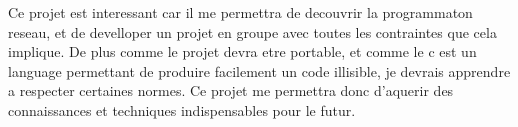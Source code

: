 Ce projet est interessant car il me permettra de decouvrir la programmaton reseau, et de develloper un projet en groupe avec toutes les contraintes que cela implique. De plus comme le projet devra etre portable, et comme le c est un language permettant de produire facilement un code illisible, je devrais apprendre a respecter certaines normes. Ce projet me permettra donc d'aquerir des connaissances et techniques indispensables pour le futur. 